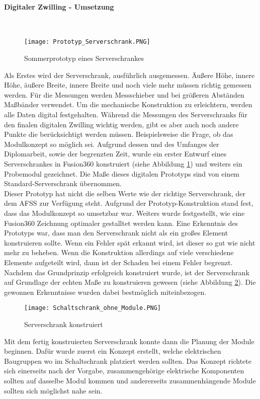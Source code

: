     \paragraph{Digitaler Zwilling - Umsetzung}\mbox{}\\ 

    \begin{figure}[h]
        \centering
        \texttt{[image: Prototyp\_Serverschrank.PNG]}
        \caption{Sommerprototyp eines Serverschrankes}
        \label{fig:Sommerprototyp}
    \end{figure}
    Als Erstes wird der Serverschrank, ausführlich ausgemessen. Äußere Höhe, innere Höhe, äußere Breite, innere Breite und noch viele mehr müssen richtig gemessen werden.    
    Für die Messungen werden Messschieber und bei größeren Abständen Maßbänder verwendet. Um die mechanische Konstruktion zu erleichtern, werden alle Daten digital festgehalten. Während die Messungen des Serverschranks für den finalen digitalen Zwilling wichtig werden, gibt es aber auch noch andere Punkte die berücksichtigt werden müssen. Beispielsweise die Frage, ob das Modulkonzept so möglich sei. Aufgrund dessen und des Umfanges der Diplomarbeit, sowie der begrenzten Zeit, wurde ein erster Entwurf eines Serverschrankes in Fusion360 konstruiert (siehe Abbildung \ref{fig:Sommerprototyp}) und weiters ein Probemodul gezeichnet. Die Maße dieses digitalen Prototyps sind von einem Standard-Serverschrank übernommen.\\
    Dieser Prototyp hat nicht die selben Werte wie der richtige Serverschrank, der dem AFSS zur Verfügung steht. Aufgrund der Prototyp-Konstruktion stand fest, dass das Modulkonzept so umsetzbar war. Weiters wurde festgestellt, wie eine Fusion360 Zeichnung optimaler gestalltet werden kann. Eine Erkenntnis des Prototyps war, dass man den Serverschrank nicht als ein großes Element konstruieren sollte. Wenn ein Fehler spät erkannt wird, ist dieser so gut wie nicht mehr zu beheben. Wenn die Konstruktion allerdings auf viele verschiedene Elemente aufgeteilt wird, dann ist der Schaden bei einem Fehler begrenzt.\\
    Nachdem das Grundprinzip erfolgreich konstruiert wurde, ist der Serverschrank auf Grundlage der echten Maße zu konstruieren gewesen (siehe Abbildung \ref{fig:Clean_Serverschrank}). Die gewonnen Erkenntnisse wurden dabei bestmöglich miteinbezogen.\\    
    \begin{figure}[h]
        \centering
        \texttt{[image: Schaltschrank\_ohne\_Module.PNG]} 
        \caption{Serverschrank konstruiert}
        \label{fig:Clean_Serverschrank}
    \end{figure}
    Mit dem fertig konstruierten Serverschrank konnte dann die Planung der Module beginnen. Dafür wurde zuerst ein Konzept erstellt, welche elektrischen Baugruppen wo im Schaltschrank platziert werden sollten. Das Konzept richtete sich einerseits nach der Vorgabe, zusammengehörige elektrische Komponenten sollten auf dasselbe Modul kommen und andererseits zusammenhängende Module sollten sich möglichst nahe sein. 
